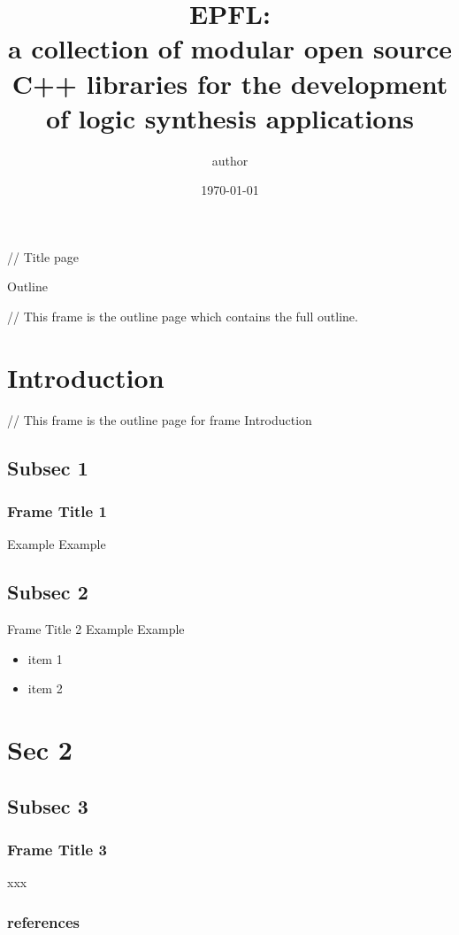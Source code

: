 \documentclass[aspectratio=1610]{beamer}
\title{EPFL: \\a collection of modular open source C++ libraries for the development of logic synthesis applications}
\author{author}
\date\today
\begin{document}
\begin{frame}[plain]
  \titlepage
  // Title page
\end{frame}


\begin{frame}{Outline}
  \tableofcontents

  // This frame is the outline page which contains the full outline.
  \end{frame}

\section{Introduction}

\begin{frame}
  \tableofcontents[currentsection, subsectionstyle=show/show/hide]

  // This frame is the outline page for frame Introduction
\end{frame}


\subsection {Subsec 1}
\begin{frame}
  \frametitle{Frame Title 1}
  Example Example
\end{frame}


\subsection {Subsec 2}
\begin{frame}{Frame Title 2}
  Example Example\cite{bagaev_vdjdb_2020}

\begin{itemize}
    \item item 1
    \item item 2
\end{itemize}

\end{frame}


\section {Sec 2}

\begin{frame}
  \tableofcontents[currentsection, subsectionstyle=show/show/hide]
\end{frame}

\subsection {Subsec 3}
\begin{frame}
  \frametitle{Frame Title 3}
xxx
\end{frame}
\begin{frame}
	\frametitle{references}
	\nocite{*}%
	\printbibliography
\end{frame}
\end{document}
